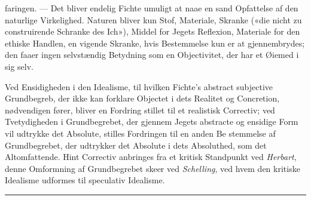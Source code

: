 \documentclass[12pt,a4paper]{book}
\newcommand{\divrule}{\begin{center}\rule{2cm}{0.4pt}\end{center}}
\begin{document}
faringen. --- Det bliver endelig Fichte umuligt at naae en sand
Opfattelse af den naturlige Virkelighed. Naturen bliver kun
Stof, Materiale, Skranke («die nicht zu construirende Schranke
des Ich»), Middel for Jegets Reflexion, Materiale for den ethiske
Handlen, en vigende Skranke, hvis Bestemmelse kun er at
gjennembrydes; den faaer ingen selvstændig Betydning som en
Objectivitet, der har et Øiemed i sig selv.

Ved Ensidigheden i den Idealisme, til hvilken Fichte's
abstract subjective Grundbegreb, der ikke kan forklare Objectet
i dets Realitet og Concretion, nødvendigen fører, bliver en
Fordring stillet til et realistisk Correctiv; ved Tvetydigheden i
Grundbegrebet, der gjennem Jegets abstracte og ensidige Form
vil udtrykke det Absolute, stilles Fordringen til en anden Be\-%
stemmelse af Grundbegrebet, der udtrykker det Absolute i dets
Absoluthed, som det Altomfattende. Hint Correctiv anbringes
fra et kritisk Standpunkt ved \emph{Herbart}, denne Omformning
af Grundbegrebet skeer ved \emph{Schelling}, ved hvem den kritiske
Idealisme udformes til speculativ Idealisme.

\divrule
\end{document}
